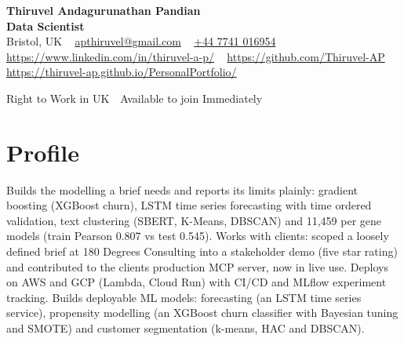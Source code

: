 \documentclass[a4paper,11pt]{article}
\begin{document}
\begin{center}
  {\LARGE\bfseries Thiruvel Andagurunathan Pandian} \\[3pt]
  {\color{headernavy}\small\textbf{Data Scientist}} \\[3pt]
  {\small
  Bristol, UK\nobreak\ \,\textbar\, \href{mailto:apthiruvel@gmail.com}{apthiruvel@gmail.com}\nobreak\ \,\textbar\, \href{tel:+447741016954}{+44 7741 016954}\nobreak\ \,\textbar\, \href{https://www.linkedin.com/in/thiruvel-a-p/}{https://www.linkedin.com/in/thiruvel-a-p/}\nobreak\ \,\textbar\, \href{https://github.com/Thiruvel-AP}{https://github.com/Thiruvel-AP}\nobreak\ \,\textbar\, \href{https://thiruvel-ap.github.io/PersonalPortfolio/}{https://thiruvel-ap.github.io/PersonalPortfolio/}}\par\vspace{4pt}
  \noindent{} Right to Work in UK \,\textbar\, Available to join Immediately
\end{center}

\section{Profile}
Builds the modelling a brief needs and reports its limits plainly: gradient boosting (XGBoost churn), LSTM time series forecasting with time ordered validation, text clustering (SBERT, K-Means, DBSCAN) and 11,459 per gene models (train Pearson 0.807 vs test 0.545). Works with clients: scoped a loosely defined brief at 180 Degrees Consulting into a stakeholder demo (five star rating) and contributed to the client\textquotesingle{}s production MCP server, now in live use. Deploys on AWS and GCP (Lambda, Cloud Run) with CI/CD and MLflow experiment tracking. Builds deployable ML models: forecasting (an LSTM time series service), propensity modelling (an XGBoost churn classifier with Bayesian tuning and SMOTE) and customer segmentation (k-means, HAC and DBSCAN).
\end{document}
